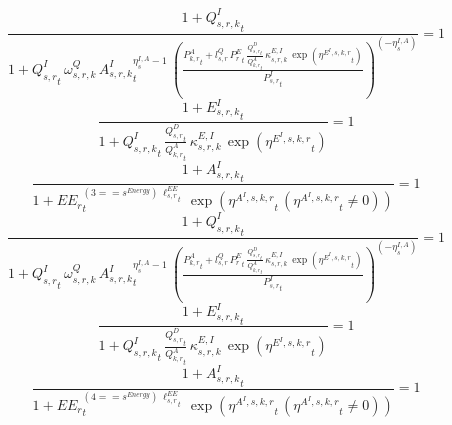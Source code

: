 \noindent[name= `regional sector demand for intermediates from aggregate sector 5 1 3']
\begin{dmath}
\frac{1+{{Q^{I}_{s,r,k}}}_{t}}{1+{{Q^{I}_{s,r}}}_{t}\, {{\omega^{Q}_{s,r,k}}}\, {{A^{I}_{s,r,k}}}_{t}^{{{\eta^{I,A}_{s}}}-1}\, \left(\frac{{{P^{A}_{k,r}}}_{t}+{{l^{Q}_{s,r}}}\, {{P^E_r}}_{t}\, \frac{{{Q^{D}_{s,r}}}_{t}}{{{Q^{A}_{k,r}}}_{t}}\, {{\kappa^{E,I}_{s,r,k}}}\, \exp\left({{\eta^{E^{I},s,k,r}}}_{t}\right)}{{{P^{I}_{s,r}}}_{t}}\right)^{\left(-{{\eta^{I,A}_{s}}}\right)}}=1
\end{dmath}
\noindent[name= `regional emissions caused by using intermediates from aggregate sector 5 1 3']
\begin{dmath}
\frac{1+{{E^I_{s,r,k}}}_{t}}{1+{{Q^{I}_{s,r,k}}}_{t}\, \frac{{{Q^{D}_{s,r}}}_{t}}{{{Q^{A}_{k,r}}}_{t}}\, {{\kappa^{E,I}_{s,r,k}}}\, \exp\left({{\eta^{E^{I},s,k,r}}}_{t}\right)}=1
\end{dmath}
\noindent[name= `productivity of intermediates in subsector 5 region 1 from sector 3']
\begin{dmath}
\frac{1+{{A^{I}_{s,r,k}}}_{t}}{1+{{EE_r}}_{t}^{\left(3=={{s^{Energy}}}\right)\, {{\ell^{EE}_{s,r}}}_{t}}\, \exp\left({{\eta^{A^{I},s,k,r}}}_{t}\, \left({{\eta^{A^{I},s,k,r}}}_{t}\neq 0\right)\right)}=1
\end{dmath}
\noindent[name= `regional sector demand for intermediates from aggregate sector 5 1 4']
\begin{dmath}
\frac{1+{{Q^{I}_{s,r,k}}}_{t}}{1+{{Q^{I}_{s,r}}}_{t}\, {{\omega^{Q}_{s,r,k}}}\, {{A^{I}_{s,r,k}}}_{t}^{{{\eta^{I,A}_{s}}}-1}\, \left(\frac{{{P^{A}_{k,r}}}_{t}+{{l^{Q}_{s,r}}}\, {{P^E_r}}_{t}\, \frac{{{Q^{D}_{s,r}}}_{t}}{{{Q^{A}_{k,r}}}_{t}}\, {{\kappa^{E,I}_{s,r,k}}}\, \exp\left({{\eta^{E^{I},s,k,r}}}_{t}\right)}{{{P^{I}_{s,r}}}_{t}}\right)^{\left(-{{\eta^{I,A}_{s}}}\right)}}=1
\end{dmath}
\noindent[name= `regional emissions caused by using intermediates from aggregate sector 5 1 4']
\begin{dmath}
\frac{1+{{E^I_{s,r,k}}}_{t}}{1+{{Q^{I}_{s,r,k}}}_{t}\, \frac{{{Q^{D}_{s,r}}}_{t}}{{{Q^{A}_{k,r}}}_{t}}\, {{\kappa^{E,I}_{s,r,k}}}\, \exp\left({{\eta^{E^{I},s,k,r}}}_{t}\right)}=1
\end{dmath}
\noindent[name= `productivity of intermediates in subsector 5 region 1 from sector 4']
\begin{dmath}
\frac{1+{{A^{I}_{s,r,k}}}_{t}}{1+{{EE_r}}_{t}^{\left(4=={{s^{Energy}}}\right)\, {{\ell^{EE}_{s,r}}}_{t}}\, \exp\left({{\eta^{A^{I},s,k,r}}}_{t}\, \left({{\eta^{A^{I},s,k,r}}}_{t}\neq 0\right)\right)}=1
\end{dmath}
